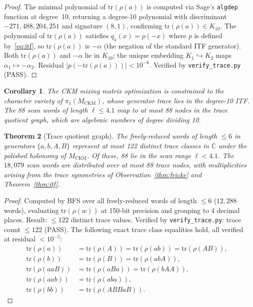\documentclass[11pt,a4paper]{article}
\newtheorem{theorem}{Theorem}
\newtheorem{corollary}[theorem]{Corollary}
\theoremstyle{remark}
\newcommand{\MCKM}{M_{\mathrm{CKM}}}
\newcommand{\CC}{\mathbb{C}}
\newcommand{\Kten}{K_{10}}
\begin{document}
\begin{proof}\sloppy
The minimal polynomial of $\mathrm{tr}(\rho(a))$
is computed via Sage's \texttt{algdep} function at degree~10, returning a
degree-10 polynomial with discriminant $-271{,}488{,}204{,}251$ and
signature $(8,1)$, confirming $\mathrm{tr}(\rho(a)) \in \Kten$.
The polynomial of $\mathrm{tr}(\rho(a))$ satisfies
$q_a(x) = p(-x)$ where $p$ is defined by~\eqref{eq:itf},
so $\mathrm{tr}(\rho(a))$ is $-\alpha$ (the negation of the standard
ITF generator).
Both $\mathrm{tr}(\rho(a))$ and $-\alpha$ lie in $\Kten$; the unique
embedding $K_1 \hookrightarrow K_2$ maps $\alpha_1 \mapsto -\alpha_2$.
Residual $|p(-\mathrm{tr}(\rho(a)))| < 10^{-6}$.
Verified by \texttt{verify\_trace.py} (PASS).
\fussy\end{proof}

\begin{corollary}
The CKM mixing matrix optimization is constrained to the character
variety of $\pi_1(\MCKM)$, whose generator trace lies in the degree-10
ITF.
The 88 scan words of length $\ell \leq 4.1$ map to at most 88 nodes
in the trace quotient graph, which are algebraic numbers of degree
dividing 10.
\end{corollary}

\begin{theorem}[Trace quotient graph]
\label{thm:quotient}
The freely-reduced words of length $\leq 6$ in generators
$\{a, b, A, B\}$ represent at most \emph{122 distinct trace classes}
in $\CC$ under the polished holonomy of $\MCKM$.
Of these, 88 lie in the scan range $\ell < 4.1$.
The $18{,}079$ scan words are distributed over at most 88 trace nodes,
with multiplicities arising from the trace symmetries of
Observation~\ref{thm:fricke} and Theorem~\ref{thm:itf}.
\end{theorem}

\begin{proof}\sloppy
Computed by BFS over all freely-reduced words of length $\leq 6$
($12{,}288$ words), evaluating $\mathrm{tr}(\rho(w))$ at 150-bit
precision and grouping to 4 decimal places.
Result: $\leq 122$ distinct trace values.
Verified by \texttt{verify\_trace.py}: trace count $\leq 122$ (PASS).
The following exact trace class equalities hold, all verified at
residual $< 10^{-5}$:
\begin{align}
\mathrm{tr}(\rho(a)) &= \mathrm{tr}(\rho(A)) = \mathrm{tr}(\rho(ab))
  = \mathrm{tr}(\rho(AB)), \label{eq:tc1} \\
\mathrm{tr}(\rho(b)) &= \mathrm{tr}(\rho(B)) = \mathrm{tr}(\rho(abA)), \label{eq:tc2} \\
\mathrm{tr}(\rho(aaB)) &= \mathrm{tr}(\rho(aBa)) = \mathrm{tr}(\rho(bAA)), \label{eq:tc3} \\
\mathrm{tr}(\rho(aab)) &= \mathrm{tr}(\rho(aba)), \label{eq:tc4} \\
\mathrm{tr}(\rho(bb)) &= \mathrm{tr}(\rho(ABBaB)). \label{eq:tc5}
\end{align}
\fussy\end{proof}
\end{document}
